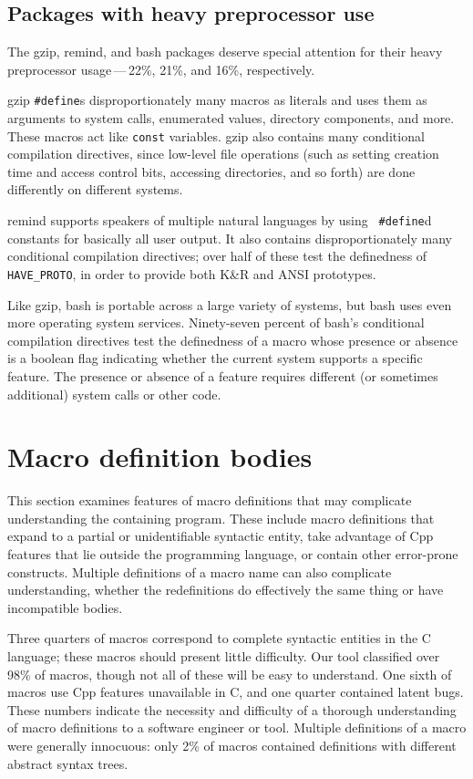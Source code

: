 \documentclass[10pt]{article}
\newcommand{\pkg}[1]{\textsf{#1}}
\begin{document}
\subsection{Packages with heavy preprocessor use}

The \pkg{gzip}, \pkg{remind}, and \pkg{bash} packages deserve
special attention for their heavy preprocessor usage\,---\,22\%, 21\%, and
16\%, respectively.

\pkg{gzip} {\tt \#define}s disproportionately many macros as literals and
uses them as arguments to system calls, enumerated values, directory
components, and more.  These macros act like {\tt const} variables.
\pkg{gzip} also contains many conditional compilation directives, since
low-level file operations (such as setting creation time and access control
bits, accessing directories, and so forth) are done differently on
different systems.

\pkg{remind} supports speakers of multiple natural languages by using {\tt
\#define}d constants for basically all user output.  It also contains
disproportionately many conditional compilation directives; over half of
these test the definedness of \verb|HAVE_PROTO|, in order to provide both
K\&R and ANSI prototypes.

Like \pkg{gzip}, \pkg{bash} is portable across a large variety of
systems, but \pkg{bash} uses even more operating system services.
Ninety-seven percent of \pkg{bash}'s conditional compilation directives
test the definedness of a macro whose presence or absence is a boolean
flag indicating whether the current system supports a specific feature.
The presence or absence of a feature requires different (or sometimes
additional) system calls or other code.


\section{Macro definition bodies}
\label{sec:categorization}

This section examines features of macro definitions that may complicate
understanding the containing program.  These include macro definitions that
expand to a partial or unidentifiable syntactic entity, take advantage of
Cpp features that lie outside the programming language, or contain other
error-prone constructs.  Multiple definitions of a macro name can also
complicate understanding, whether the redefinitions do effectively the same
thing or have incompatible bodies.

Three quarters of macros correspond to complete syntactic entities in the C
language; these macros should present little difficulty.  Our tool
classified over 98\% of macros, though not all of these will be easy to
understand.  One sixth of macros use Cpp features unavailable in C, and
one quarter contained latent bugs.  These numbers indicate the necessity
and difficulty of a thorough understanding of macro definitions to a
software engineer or tool.  Multiple definitions of a macro were generally
innocuous:  only 2\% of macros contained definitions with different
abstract syntax trees.
\end{document}
